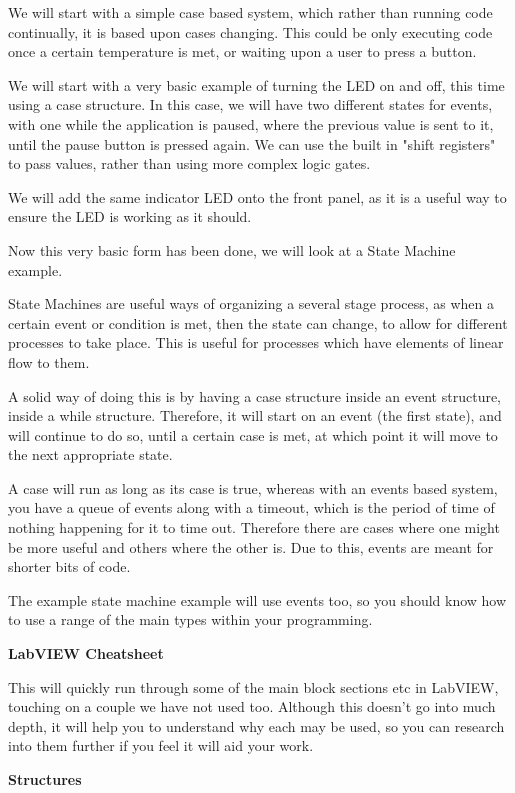 \documentclass[a4paper,11pt]{report}
\begin{document}
We will start with a simple case based system, which rather than running code continually, it is based upon cases changing. This could be only executing code once a certain temperature is met, or waiting upon a user to press a button.

We will start with a very basic example of turning the LED on and off, this time using a case structure. In this case, we will have two different states for events, with one while the application is paused, where the previous value is sent to it, until the pause button is pressed again. We can use the built in "shift registers" to pass values, rather than using more complex logic gates.

We will add the same indicator LED onto the front panel, as it is a useful way to ensure the LED is working as it should.

Now this very basic form has been done, we will look at a State Machine example.

State Machines are useful ways of organizing a several stage process, as when a certain event or condition is met, then the state can change, to allow for different processes to take place. This is useful for processes which have elements of linear flow to them.

A solid way of doing this is by having a case structure inside an event structure, inside a while structure. Therefore, it will start on an event (the first state), and will continue to do so, until a certain case is met, at which point it will move to the next appropriate state.

A case will run as long as its case is true, whereas with an events based system, you have a queue of events along with a timeout, which is the period of time of nothing happening for it to time out. Therefore there are cases where one might be more useful and others where the other is. Due to this, events are meant for shorter bits of code.

The example state machine example will use events too, so you should know how to use a range of the main types within your programming.

\textbf{LabVIEW Cheatsheet}

This will quickly run through some of the main block sections etc in LabVIEW, touching on a couple we have not used too. Although this doesn't go into much depth, it will help you to understand why each may be used, so you can research into them further if you feel it will aid your work.

\textbf{Structures}
\end{document}
